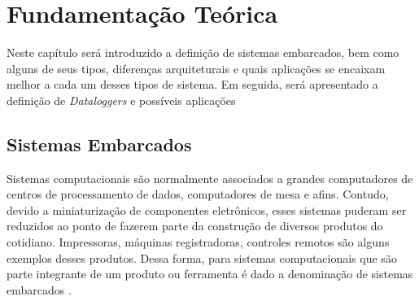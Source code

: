 \chapter{Fundamentação Teórica}
\label{cap:fundamentacao-teorica}



Neste capítulo será introduzido a definição de sistemas embarcados, bem como alguns de seus tipos, diferenças arquiteturais e quais aplicações se encaixam melhor a cada um desses tipos de sistema. Em seguida, será apresentado a definição de \textit{Dataloggers} e possíveis aplicações





\section{Sistemas Embarcados}\label{sec:definicao_sistemas_embarcados}



Sistemas computacionais são normalmente associados a grandes computadores de centros de processamento de dados, computadores de mesa e afins. Contudo, devido a miniaturização de componentes eletrônicos, esses sistemas puderam ser reduzidos ao ponto de fazerem parte da construção de diversos produtos do cotidiano. Impressoras, máquinas registradoras, controles remotos são alguns exemplos desses produtos. Dessa forma, para sistemas computacionais que são parte integrante de um produto ou ferramenta é dado a denominação de sistemas embarcados \cite{vahid2001embedded}.

